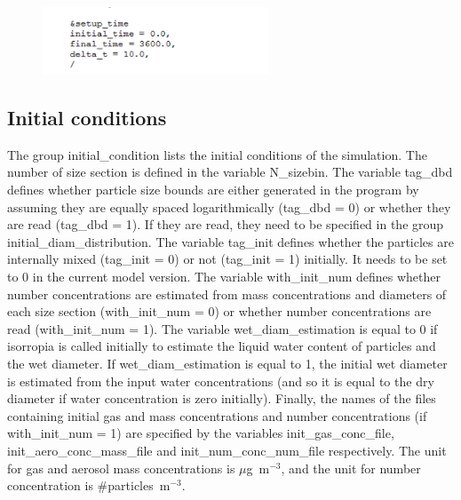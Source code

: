 \documentclass[a4paper,11pt]{article}
\begin{document}
\begin{figure}[H]
        \begin{center}
                \includegraphics[angle=0,width=0.6\textwidth]{fig/setuptime.png}
       \end{center}
\end{figure}

\subsection{Initial conditions}
 
The group initial\_condition lists the initial conditions of the simulation. The number of size section is defined in the variable N\_sizebin. The variable tag\_dbd defines whether particle size bounds are either generated in the program by assuming they are equally spaced logarithmically (tag\_dbd = 0) or whether they are read (tag\_dbd = 1). If they are read, they need to be specified in the group initial\_diam\_distribution.
The variable tag\_init defines whether the particles are internally mixed (tag\_init = 0) or not (tag\_init = 1) initially. It needs to be set to 0 in the current model version.
The variable with\_init\_num defines whether number concentrations are estimated from mass concentrations and diameters of each size section (with\_init\_num = 0) or whether number concentrations are read (with\_init\_num = 1).
The variable wet\_diam\_estimation is equal to 0 if isorropia is called
initially to estimate the liquid water content of particles and the wet
diameter. If wet\_diam\_estimation is equal to 1, the initial wet diameter is
estimated from the input water concentrations (and so it is equal to the dry
diameter if water concentration is zero initially).
Finally, the names of the files containing initial gas and mass concentrations and number concentrations (if with\_init\_num = 1) are specified by the variables init\_gas\_conc\_file, init\_aero\_conc\_mass\_file and init\_num\_conc\_num\_file respectively.
The unit for gas and aerosol mass concentrations is $\mu$g~m$^{-3}$, and the unit for number concentration is \#particles~m$^{-3}$.
\end{document}
